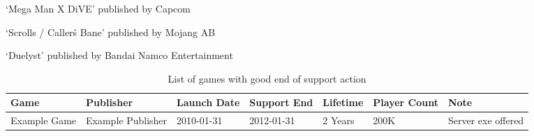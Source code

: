 `Mega Man X DiVE' published by Capcom

`Scrolls / Caller\'s Bane' published by Mojang AB

`Duelyst' published by Bandai Namco Entertainment

\begin{landscape}
    \begin{table}[htbp]
        \centering
        \caption{List of games with good end of support action}%
        \label{tab:savedgames}
        \begin{tabular*}{1\textwidth}{lllllll}
            Game & Publisher & Launch Date & Support End & Lifetime & Player Count & Note \\ \toprule
            Example Game & Example Publisher & 2010-01-31 & 2012-01-31 & 2 Years & 200K & Server exe offered \\
        \end{tabular*}
    \end{table}
\end{landscape}
